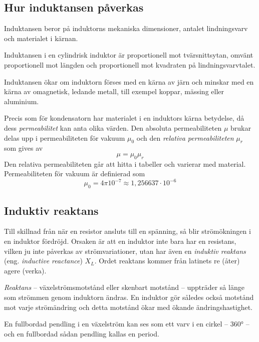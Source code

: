 \subsection{Hur induktansen påverkas}

Induktansen beror på induktorns mekaniska dimensioner, antalet lindningsvarv och
materialet i kärnan.

Induktansen i en cylindrisk induktor är proportionell mot tvärsnittsytan, omvänt
proportionell mot längden och proportionell mot kvadraten på lindningsvarvtalet.

Induktansen ökar om induktorn förses med en kärna av järn och minskar med en
kärna av omagnetisk, ledande metall, till exempel koppar, mässing eller
aluminium.

Precis som för kondensatorn har materialet i en induktors kärna betydelse,
då dess \emph{permeabilitet} kan anta olika värden. Den absoluta permeabiliteten
\(\mu\) brukar delas upp i permeabiliteten för vakuum \(\mu_0\) och den
\emph{relativa permeabiliteten} \(\mu_r\) som gives av
\[\mu = \mu_0\mu_r\]
Den relativa permeabiliteten går att hitta i tabeller och varierar med material.
Permeabiliteten för vakuum är definierad som
\[\mu_0 = 4\pi 10^{-7} \approx 1,256637 \cdot 10^{-6}\]

\subsection{Induktiv reaktans}
\label{induktiv_reaktans} 

Till skillnad från när en resistor ansluts till en spänning, så blir
strömökningen i en induktor fördröjd. Orsaken är att en induktor inte bara har
en resistans, vilken ju inte påverkas av strömvariationer, utan har även en
\emph{induktiv reaktans} (eng. \emph{inductive reactance}) \(X_L\).
Ordet reaktans kommer från latinets re (åter) agere (verka).

\emph{Reaktans} -- växelströmsmotstånd eller skenbart motstånd -- uppträder så
länge som strömmen genom induktorn ändras.
En induktor gör således också motstånd mot varje strömändring och detta motstånd
ökar med ökande ändringshastighet.

En fullbordad pendling i en växelström kan ses som ett varv i en cirkel --
\ang{360} -- och en fullbordad sådan pendling kallas en period.

